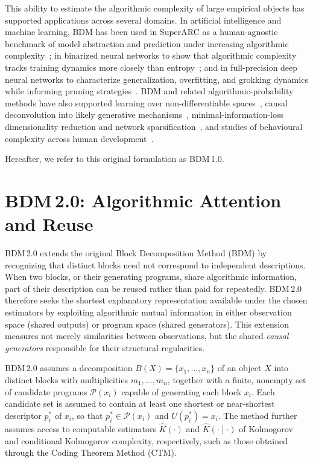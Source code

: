 \documentclass{article}
\begin{document}
This ability to estimate the algorithmic complexity of large empirical objects has supported applications across several domains. In artificial intelligence and machine learning, BDM has been used in SuperARC as a human-agnostic benchmark of model abstraction and prediction under increasing algorithmic complexity~\cite{hernandez-espinosa_superarc_2026}; in binarized neural networks to show that algorithmic complexity tracks training dynamics more closely than entropy~\cite{sakabe_binarized_2026}; and in full-precision deep neural networks to characterize generalization, overfitting, and grokking dynamics while informing pruning strategies~\cite{bakhtiarifard_characterizing_2026}. BDM and related algorithmic-probability methods have also supported learning over non-differentiable spaces~\cite{hernandez-orozco_algorithmic_2021}, causal deconvolution into likely generative mechanisms~\cite{zenil_causal_2019}, minimal-information-loss dimensionality reduction and network sparsification~\cite{zenil_minimal_2025}, and studies of behavioural complexity across human development~\cite{gauvrit_human_2017}.

Hereafter, we refer to this original formulation as BDM\,1.0.


\section[BDM 2.0: Algorithmic Attention and Reuse]{BDM\,2.0: Algorithmic Attention and Reuse}

BDM\,2.0 extends the original Block Decomposition Method (BDM) by recognizing that distinct blocks need not correspond to independent descriptions. When two blocks, or their generating programs, share algorithmic information, part of their description can be reused rather than paid for repeatedly. BDM\,2.0 therefore seeks the shortest explanatory representation available under the chosen estimators by exploiting algorithmic mutual information in either observation space (shared outputs) or program space (shared generators). This extension measures not merely similarities between observations, but the shared \emph{causal generators} responsible for their structural regularities.


BDM\,2.0 assumes a decomposition \(B(X)=\{x_1,\ldots,x_n\}\) of an object \(X\) into distinct blocks with multiplicities \(m_1,\ldots,m_n\), together with a finite, nonempty set of candidate programs \(\mathcal{P}(x_i)\) capable of generating each block \(x_i\). Each candidate set is assumed to contain at least one shortest or near-shortest descriptor \(p_i^*\) of \(x_i\), so that \(p_i^*\in\mathcal{P}(x_i)\) and \(U(p_i^*)=x_i\). The method further assumes access to computable estimators \(\hat K(\cdot)\) and \(\hat K(\cdot\mid\cdot)\) of Kolmogorov and conditional Kolmogorov complexity, respectively, such as those obtained through the Coding Theorem Method (CTM).
\end{document}
